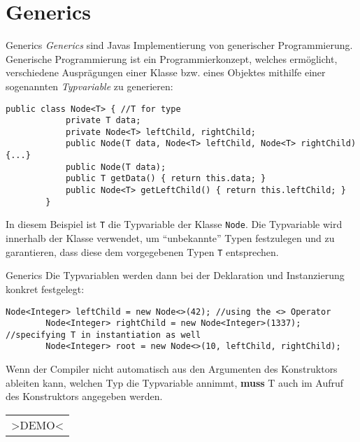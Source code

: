 \section{Generics}
\begin{frame}[fragile]{Generics}
    \onslide<+->
    \textit{Generics} sind Javas Implementierung von generischer Programmierung.\\
    \onslide<+->
    Generische Programmierung ist ein Programmierkonzept, welches ermöglicht, verschiedene Ausprägungen einer Klasse bzw. eines Objektes mithilfe einer sogenannten \textit{Typvariable} zu generieren:
    \onslide<+->
    \begin{lstlisting}[basicstyle=\ttfamily\scriptsize,gobble=8]
        public class Node<T> { //T for type
            private T data;
            private Node<T> leftChild, rightChild;
            public Node(T data, Node<T> leftChild, Node<T> rightChild) {...}
            public Node(T data);
            public T getData() { return this.data; }
            public Node<T> getLeftChild() { return this.leftChild; }
        }
    \end{lstlisting}
    \onslide<+->
    In diesem Beispiel ist \texttt{T} die Typvariable der Klasse \texttt{Node}.
    Die Typvariable wird innerhalb der Klasse verwendet, um \enquote{unbekannte} Typen festzulegen und zu garantieren,
    dass diese dem vorgegebenen Typen \texttt{T} entsprechen.
\end{frame}

\begin{frame}[fragile]{Generics}
    \onslide<+->
    Die Typvariablen werden dann bei der Deklaration und Instanzierung konkret festgelegt:
    \onslide<+->
    \begin{lstlisting}[basicstyle=\ttfamily\scriptsize,gobble=8]
        Node<Integer> leftChild = new Node<>(42); //using the <> Operator
        Node<Integer> rightChild = new Node<Integer>(1337); //specifying T in instantiation as well
        Node<Integer> root = new Node<>(10, leftChild, rightChild);
    \end{lstlisting}
    \onslide<+->
    Wenn der Compiler nicht automatisch aus den Argumenten des Konstruktors ableiten kann, welchen Typ die Typvariable annimmt,
    \textbf{muss} T auch im Aufruf des Konstruktors angegeben werden.\\
    \bigskip
    \onslide<+->
    \begin{center}
        \begin{tabular}{l}
            \Large
            >DEMO<\\
        \end{tabular}
    \end{center}
\end{frame}

